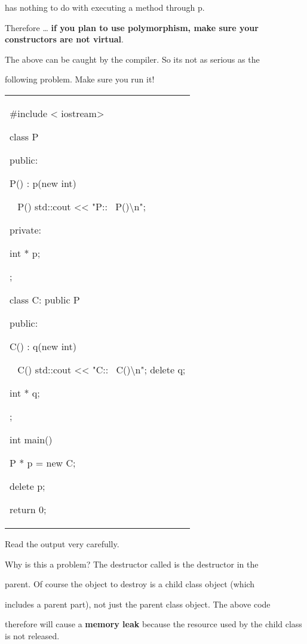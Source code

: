 has nothing to do with executing a method through p.

Therefore \ldots{} \textbf{if you plan to use polymorphism, make sure
your constructors are not virtual}.

The above can be caught by the compiler. So it\textquotesingle s not as
serious as the

following problem. Make sure you run it!

\begin{longtable}[]{@{}
  >{\raggedright\arraybackslash}p{}@{}}
\toprule\noalign{}
 \\
\midrule\noalign{}
\endhead
\bottomrule\noalign{}
\endlastfoot
\#include < iostream\textgreater{}

class P

{

public:

P() : p(new int) {}

~ P() { std::cout <<{}
"P::~ P()\textbackslash n"; }

private:

int * p;

};

class C: public P

{

public:

C() : q(new int) {}

~ C() { std::cout <<{}
"C::~ C()\textbackslash n"; delete q; }

int * q;

};

int main()

{

P * p = new C;

delete p;

return 0;

} \\
\end{longtable}

Read the output very carefully.

Why is this a problem? The destructor called is the destructor in the

parent. Of course the object to destroy is a child class object (which

includes a parent part), not just the parent class object. The above
code

therefore will cause a \textbf{memory leak }because the resource used by
the child class is not released.

